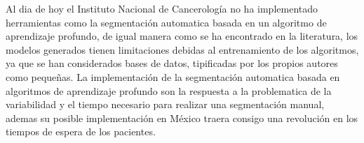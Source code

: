 \documentclass{article}
\begin{document}
\vspace{10pt}

Al dia de hoy el Instituto Nacional de Cancerología no ha implementado herramientas como la segmentación automatica basada en un algoritmo de aprendizaje profundo, de igual manera como se ha encontrado en la literatura, los modelos generados tienen limitaciones debidas al entrenamiento de los algoritmos, ya que se han considerados bases de datos, tipificadas por los propios autores como pequeñas. La implementación de la segmentación automatica basada en algoritmos de aprendizaje profundo son la respuesta a la problematica de la variabilidad y el tiempo necesario para realizar una segmentación manual, ademas su posible implementación en México traera consigo una revolución en los tiempos de espera de los pacientes.
\end{document}
